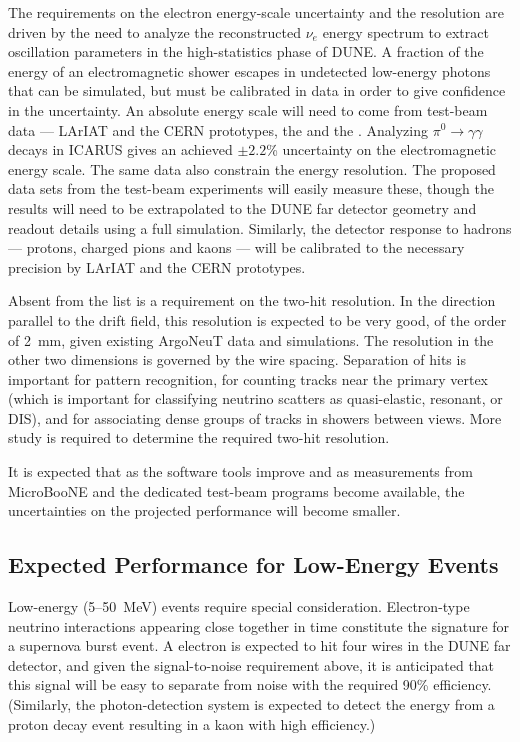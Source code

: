 The requirements on the electron energy-scale uncertainty and the
resolution are driven by the need to analyze the reconstructed $\nu_e$
energy spectrum to extract oscillation parameters in the
high-statistics phase of DUNE.  A fraction of the energy of an
electromagnetic shower escapes in undetected low-energy photons that
can be simulated, but  must be calibrated in data in order to give
confidence in the uncertainty.  An absolute energy scale will need to
come from test-beam data --- LArIAT and the CERN prototypes, the
\cernsingleproto{} and the \cerndualproto.  Analyzing
$\pi^0\rightarrow\gamma\gamma$ decays in ICARUS\cite{ICARUS-pizero}
gives an achieved $\pm 2.2$\% uncertainty on the electromagnetic
energy scale.  The same data also constrain the energy resolution.
The proposed data sets from the test-beam experiments will easily
measure these, though the results will need to be extrapolated to the
DUNE far detector geometry and readout details using a full
simulation.  Similarly, the detector response to hadrons --- protons,
charged pions and kaons --- will be calibrated to the necessary precision
by LArIAT and the CERN prototypes.


Absent from the list is a requirement on the two-hit resolution.  In the
direction parallel to the drift field, this resolution is expected to
be very good, of the order of 2~mm, given existing ArgoNeuT data and
simulations.  The resolution in the other two dimensions is governed
by the wire spacing.  Separation of hits is important for pattern
recognition, for counting tracks near the primary vertex (which is
important for classifying neutrino scatters as quasi-elastic,
resonant, or DIS), and for associating dense groups of tracks in
showers between views.  More study is required to determine
the required two-hit resolution.

It is expected that as the software tools improve and as measurements
from MicroBooNE and the dedicated test-beam programs become
available, the uncertainties on the projected performance will become
smaller.

\subsection{Expected Performance for Low-Energy Events}\label{sec:detectors-fd-ref-perf-lowe}

Low-energy (5--50~MeV) events require special consideration.
Electron-type neutrino interactions appearing close together in time
constitute the signature for a supernova burst event.  A  electron
is expected to hit four wires in the DUNE far detector, and given the
signal-to-noise requirement above, it is anticipated that this signal
will be easy to separate from noise with the required 90\% efficiency.
(Similarly, the photon-detection system is expected to detect the energy
from a proton decay event resulting in a  kaon with high
efficiency.)

